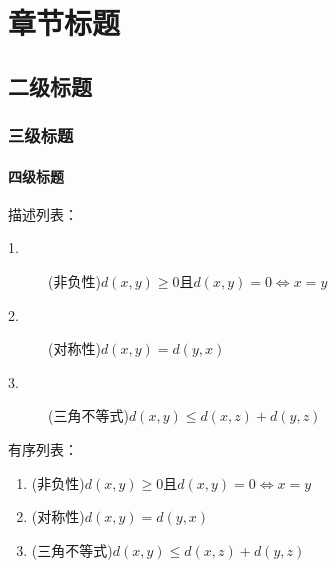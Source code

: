 \chapter{章节标题}
\section{二级标题}
\subsection{三级标题}
\subsubsection{四级标题}

描述列表：
\begin{description}
    \item[1.] (非负性)$d(x,y)\geqslant 0$且$d(x,y)=0\Leftrightarrow x=y$
    \item[2.] (对称性)$d(x,y)=d(y,x)$
    \item[3.] (三角不等式)$d(x,y)\leqslant d(x,z)+d(y,z)$
\end{description}

有序列表：
\begin{enumerate}
    \item (非负性)$d(x,y)\geqslant 0$且$d(x,y)=0\Leftrightarrow x=y$
    \item (对称性)$d(x,y)=d(y,x)$
    \item (三角不等式)$d(x,y)\leqslant d(x,z)+d(y,z)$
\end{enumerate}

